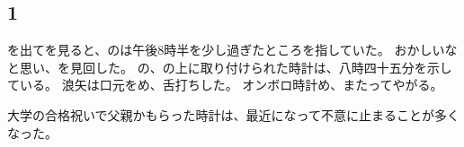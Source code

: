 \documentclass[chapter3.tex]{subfiles}
\begin{document}
\begin{CJK}{UTF8}{ipxm}
    \section*{1}

    を出てを見ると、のは午後8時半を少し過ぎたところを指していた。
    おかしいなと思い、を見回した。
    の、の上に取り付けられた時計は、八時四十五分を示している。
    浪矢は口元をめ、舌打ちした。
    オンボロ時計め、またってやがる。

    大学の合格祝いで父親かもらった時計は、最近になって不意に止まることが多くなった。



\end{CJK}
\end{document}
